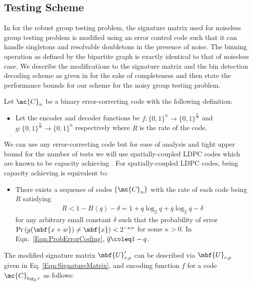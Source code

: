 \documentclass[conference,,twocolumn]{IEEEtran}
\begin{document}
\subsection*{Testing Scheme}
In \cite{lee2015saffron} for the robust group testing problem, the signature matrix used for noiseless group testing problem is modified using an error control code such that it can handle singletons and resolvable doubletons in the presence of noise. The binning operation as defined by the bipartite graph is exactly identical to that of noiseless case. We describe the modifications to the signature matrix and the bin detection decoding scheme as given in \cite{lee2015saffron} for the sake of completeness and then state the performance bounds for our scheme for the noisy group testing problem.

Let $\mc{C}_n$ be a binary error-correcting code with the following definition:
\begin{itemize}
\item Let the encoder and decoder functions be $f:\{0,1\}^{n}\rightarrow \{0,1\}^{\frac{n}{R}}$ and $g:\{0,1\}^{\frac{n}{R}}\rightarrow \{0,1\}^{n}$ respectively where $R$ is the rate of the code.
\end{itemize}
We can use any error-correcting code but for ease of analysis and tight upper bound for the number of tests we will use spatially-coupled LDPC codes which are known to be capacity achieving \cite{kumar2014threshold,kudekar2013spatially}. For spatially-coupled LDPC codes, being capacity achieving is equivalent to: 
\begin{itemize}
\item There exists a sequence of codes $\{\mc{C}_n\}$ with the rate of each code being $R$ satisfying 
\begin{align}
\label{Eqn:ProbErrorCoding}
R<1-H(q)-\delta=1+q\log_2 q+ \overline{q}\log_2\overline{q}-\delta
\end{align}
for any arbitrary small constant $\delta$ such that the probability of error $\text{Pr}\left(g(\mbf{x+w})\neq \mbf{x}\right)<2^{-\kappa n}$ for some $\kappa >0$. In Eqn.~\ref{Eqn:ProbErrorCoding}, $\overline{q}\coleq 1-q$. 
\end{itemize} 
The modified signature matrix $\mbf{U}'_{r,p}$ can be described via $\mbf{U}_{r, p}$ given in Eq. \eqref{Eqn:SignatureMatrix}, and encoding function $f$ for a code $\mc{C}_{\log_2 r}$ as follows:
\end{document}
